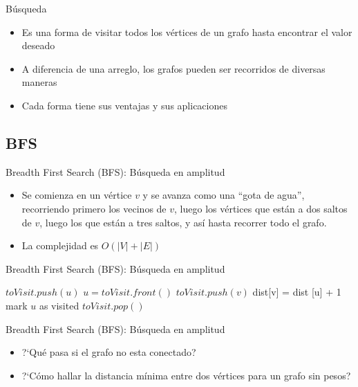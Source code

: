 \documentclass[]{beamer}
\begin{document}
\begin{frame}{B\'usqueda}
  \begin{itemize}
    \item Es una forma de visitar todos los v\'ertices de un grafo hasta encontrar el valor deseado
      \pause
    \item A diferencia de una arreglo, los grafos pueden ser recorridos de diversas maneras
      \pause
    \item Cada forma tiene sus ventajas y sus aplicaciones
  \end{itemize}
\end{frame}

\subsection{BFS}
\begin{frame}{Breadth First Search (BFS): B\'usqueda en amplitud}
  \begin{itemize}
    \item Se comienza en un v\'ertice $v$ y se avanza como una ``gota de agua'', recorriendo primero los vecinos de $v$, luego los v\'ertices que est\'an a dos saltos de $v$, luego los que est\'an a tres saltos, y as\'i hasta recorrer todo el grafo.
      \pause
    \item La complejidad es $O(|V| + |E|)$
  \end{itemize}
\end{frame}

\begin{frame}{Breadth First Search (BFS): B\'usqueda en amplitud}
  \begin{algorithm}[H]
    {$ toVisit.push(u) $} 
    {
      $u = toVisit.front() $
      {
        {
          {$ toVisit.push(v)  $} \;
          { dist[v] = dist [u] + 1 } \;
          { mark $u$ as visited } \;
        }
      }
      { $toVisit.pop()$ }
    }
  \end{algorithm}
\end{frame}

\begin{frame}{Breadth First Search (BFS): B\'usqueda en amplitud}
  \begin{itemize}
    \item ?`Qu\'e pasa si el grafo no esta conectado?
      \pause
    \item ?`C\'omo hallar la distancia m\'inima entre dos v\'ertices para un grafo sin pesos?
  \end{itemize}
\end{frame}
\end{document}
